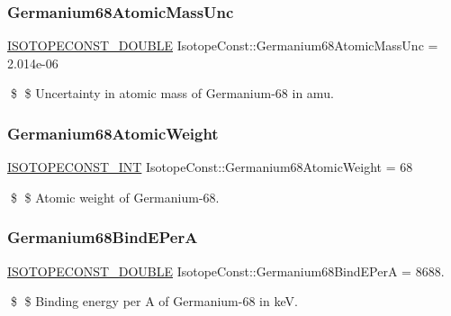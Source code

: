 \subsubsection{\texorpdfstring{Germanium68\+Atomic\+Mass\+Unc}{Germanium68AtomicMassUnc}}
{\footnotesize\ttfamily \mbox{\hyperlink{group___isotope_const-_macros_ga8f45a7272ce02c0b4c65c44636ed719a}{I\+S\+O\+T\+O\+P\+E\+C\+O\+N\+S\+T\+\_\+\+D\+O\+U\+B\+LE}} Isotope\+Const\+::\+Germanium68\+Atomic\+Mass\+Unc = 2.\+014e-\/06}

\$ \$ Uncertainty in atomic mass of Germanium-\/68 in amu. \mbox{\label{group___isotope_const-_germanium-_ge68_gae15d68c84e4606d5eaad7372abbc3912}} 
\subsubsection{\texorpdfstring{Germanium68\+Atomic\+Weight}{Germanium68AtomicWeight}}
{\footnotesize\ttfamily \mbox{\hyperlink{group___isotope_const-_macros_ga5f18360b3e99483a35c32d789e62621c}{I\+S\+O\+T\+O\+P\+E\+C\+O\+N\+S\+T\+\_\+\+I\+NT}} Isotope\+Const\+::\+Germanium68\+Atomic\+Weight = 68}

\$ \$ Atomic weight of Germanium-\/68. \mbox{\label{group___isotope_const-_germanium-_ge68_ga4eb167b2aa1c078ab84e8da885732908}} 
\subsubsection{\texorpdfstring{Germanium68\+Bind\+E\+PerA}{Germanium68BindEPerA}}
{\footnotesize\ttfamily \mbox{\hyperlink{group___isotope_const-_macros_ga8f45a7272ce02c0b4c65c44636ed719a}{I\+S\+O\+T\+O\+P\+E\+C\+O\+N\+S\+T\+\_\+\+D\+O\+U\+B\+LE}} Isotope\+Const\+::\+Germanium68\+Bind\+E\+PerA = 8688.}

\$ \$ Binding energy per A of Germanium-\/68 in keV. \mbox{\label{group___isotope_const-_germanium-_ge68_gae6683facdb27ccbb2b6166e491ffa1b5}} 

